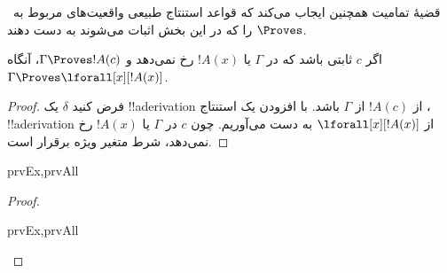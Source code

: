 \documentclass[../../../include/open-logic-section]{subfiles}
\begin{document}


\begin{explain}
  قضیهٔ تمامیت همچنین ایجاب می‌کند که قواعد استنتاج طبیعی واقعیت‌های
  مربوط به~$\Proves$ را که در این بخش اثبات می‌شوند به دست دهند.
\end{explain}

\begin{thm}
 اگر $c$ ثابتی باشد که در
$\Gamma$ یا $!A(x)$ رخ نمی‌دهد و $\Gamma \Proves !A(c)$، آنگاه
$\Gamma \Proves \lforall[x][!A(x)]$.
\end{thm}

\begin{proof}
فرض کنید $\delta$ یک !!a{derivation} از $!A(c)$ از $\Gamma$ باشد. با
افزودن یک استنتاج \Intro{\lforall}، !!a{derivation} از
$\lforall[x][!A(x)]$ به دست می‌آوریم. چون $c$ در $\Gamma$ یا $!A(x)$
رخ نمی‌دهد، شرط متغیر ویژه برقرار است.
\end{proof}

\begin{prop}
\begin{tagenumerate}{prvEx,prvAll}

\end{tagenumerate}
\end{prop}

\begin{proof}
\begin{tagenumerate}{prvEx,prvAll}

\end{tagenumerate}
\end{proof}
\end{document}
